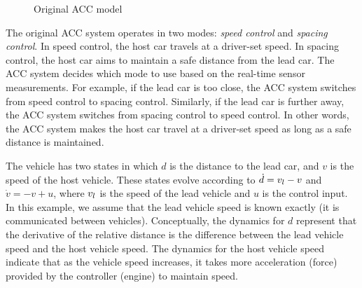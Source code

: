 \begin{figure}[t!]
\begin{adjustbox}{max size={0.99\columnwidth}{0.75\textheight}}
%
	\end{adjustbox}%
	\caption{Original ACC model}%
\end{figure}


%
The original ACC system operates in two modes: \emph{speed control} and \emph{spacing control}. In speed control, the host car travels at a driver-set speed. In spacing control, the host car aims to maintain a safe distance from the lead car. The ACC system decides which mode to use based on the real-time sensor measurements. For example, if the lead car is too close, the ACC system switches from speed control to spacing control. 
%
Similarly, if the lead car is further away, the ACC system switches from spacing control to speed control. In other words, the ACC system makes the host car travel at a driver-set speed as long as a safe distance is maintained.

The vehicle has two states in which $d$ is the distance to the lead car, and $v$ is the speed of the host vehicle. These states evolve according to $\dot{d} = v_{l} - v$ and $\dot{v} = -v + u$, 
%
where $v_{l}$ is the speed of the lead vehicle  and $u$ is the control input.  In this example, we assume that the lead vehicle speed is known exactly (\eg it is communicated between vehicles). Conceptually, the dynamics for $d$ represent that the derivative of the relative distance is the difference between the lead vehicle speed and the host vehicle speed.  The dynamics for the host vehicle speed indicate that as the vehicle speed increases, it takes more acceleration (\ie force) provided by the controller (\ie engine) to maintain speed. 

